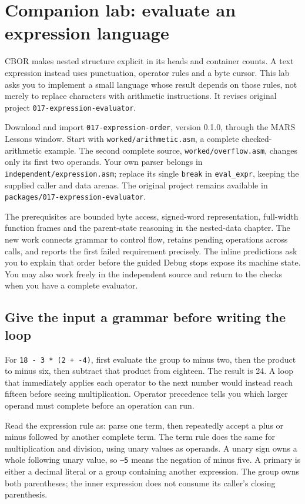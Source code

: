 \section{Companion lab: evaluate an expression language}
\label{revision-lab:expression}

CBOR makes nested structure explicit in its heads and container counts. A text
expression instead uses punctuation, operator rules and a byte cursor. This lab
asks you to implement a small language whose result depends on those rules, not
merely to replace characters with arithmetic instructions. It revises original
project \texttt{017-expression-evaluator}.

Download and import \texttt{017-expression-order}, version 0.1.0, through the
MARS Lessons window. Start with \texttt{worked/arithmetic.asm}, a complete
checked-arithmetic example. The second complete source,
\texttt{worked/overflow.asm}, changes only its first two operands. Your own
parser belongs in \texttt{independent/expression.asm}; replace its single
\texttt{break} in \texttt{eval\_expr}, keeping the supplied caller and data arenas.
The original project remains available in
\texttt{packages/017-expression-evaluator}.

The prerequisites are bounded byte access, signed-word representation, full-width
function frames and the parent-state reasoning in the nested-data chapter.
The new work connects grammar to control flow, retains pending operations across
calls, and reports the first failed requirement precisely. The inline predictions
ask you to explain that order before the guided Debug stops expose its machine
state. You may also work freely in the independent source and return to the
checks when you have a complete evaluator.

\subsection*{Give the input a grammar before writing the loop}

For \texttt{18 - 3 * (2 + -4)}, first evaluate the group to minus two, then the
product to minus six, then subtract that product from eighteen. The result is
24. A loop that immediately applies each operator to the next number would
instead reach fifteen before seeing multiplication. Operator precedence tells
you which larger operand must complete before an operation can run.



Read the expression rule as: parse one term, then repeatedly accept a plus or
minus followed by another complete term. The term rule does the same for
multiplication and division, using unary values as operands. A unary sign owns
a whole following unary value, so \texttt{--5} means the negation of minus five.
A primary is either a decimal literal or a group containing another expression.
The group owns both parentheses; the inner expression does not consume its
caller's closing parenthesis.

